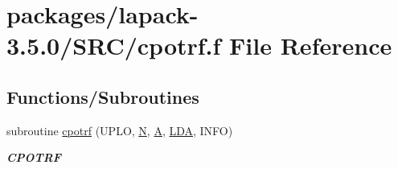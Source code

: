 \hypertarget{cpotrf_8f}{}\section{packages/lapack-\/3.5.0/\+S\+R\+C/cpotrf.f File Reference}
\label{cpotrf_8f}
\subsection*{Functions/\+Subroutines}
\begin{DoxyCompactItemize}
\item 
subroutine \hyperlink{group__complexPOcomputational_ga4e85f48dbd837ccbbf76aa077f33de19}{cpotrf} (U\+P\+L\+O, \hyperlink{polmisc_8c_a0240ac851181b84ac374872dc5434ee4}{N}, \hyperlink{classA}{A}, \hyperlink{example__user_8c_ae946da542ce0db94dced19b2ecefd1aa}{L\+D\+A}, I\+N\+F\+O)
\begin{DoxyCompactList}\small\item\em {\bfseries C\+P\+O\+T\+R\+F} \end{DoxyCompactList}\end{DoxyCompactItemize}
